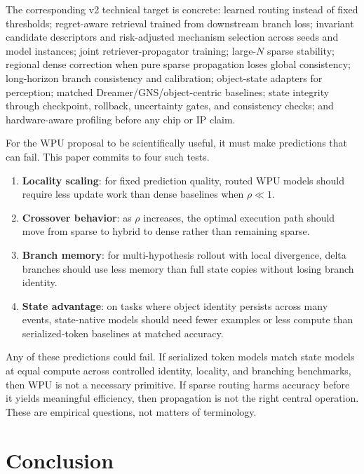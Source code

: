 \documentclass[11pt]{article}
\begin{document}
The corresponding v2 technical target is concrete: learned routing instead of
fixed thresholds; regret-aware retrieval trained from downstream branch loss;
invariant candidate descriptors and risk-adjusted mechanism selection across
seeds and model instances; joint retriever-propagator training; large-\(N\)
sparse stability; regional dense correction when pure sparse propagation loses global consistency; long-horizon
branch consistency and calibration; object-state adapters for perception;
matched Dreamer/GNS/object-centric baselines; state integrity through
checkpoint, rollback, uncertainty gates, and consistency checks; and
hardware-aware profiling before any chip or IP claim.

For the WPU proposal to be scientifically useful, it must make predictions that
can fail. This paper commits to four such tests.

\begin{enumerate}[leftmargin=*]
\item \textbf{Locality scaling}: for fixed prediction quality, routed WPU models
should require less update work than dense baselines when \(\rho \ll 1\).
\item \textbf{Crossover behavior}: as \(\rho\) increases, the optimal execution
path should move from sparse to hybrid to dense rather than remaining sparse.
\item \textbf{Branch memory}: for multi-hypothesis rollout with local
divergence, delta branches should use less memory than full state copies without
losing branch identity.
\item \textbf{State advantage}: on tasks where object identity persists across
many events, state-native models should need fewer examples or less compute than
serialized-token baselines at matched accuracy.
\end{enumerate}

Any of these predictions could fail. If serialized token models match state
models at equal compute across controlled identity, locality, and branching
benchmarks, then WPU is not a necessary primitive. If sparse routing harms
accuracy before it yields meaningful efficiency, then propagation is not the
right central operation. These are empirical questions, not matters of
terminology.

\section{Conclusion}
\end{document}

